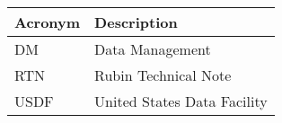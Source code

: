 \addtocounter{table}{-1}
\begin{longtable}{p{}p{}}\hline
\textbf{Acronym} & \textbf{Description}  \\\hline

DM & Data Management \\\hline
RTN & Rubin Technical Note \\\hline
USDF & United States Data Facility \\\hline
\end{longtable}
